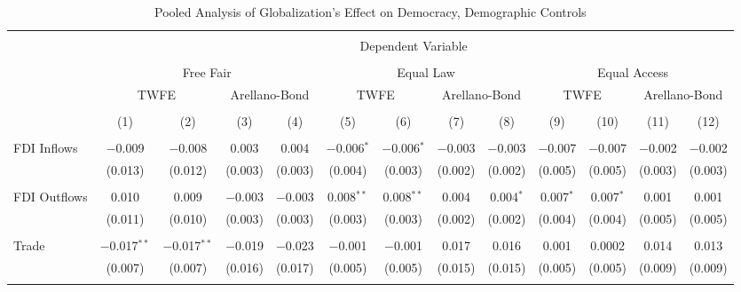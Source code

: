 
\begin{table} \centering 
  \caption{Pooled Analysis of Globalization's Effect on Democracy, Demographic Controls} 
  \label{} 
\small 
\begin{tabular}{@{\extracolsep{2pt}}lcccccccccccc} 
\\[-1.8ex]\hline 
\hline \\[-1.8ex] 
 & \multicolumn{12}{c}{Dependent Variable} \\ 
\cline{2-13} 
\\[-1.8ex] & \multicolumn{4}{c}{Free Fair} & \multicolumn{4}{c}{Equal Law} & \multicolumn{4}{c}{Equal Access} \\ 
 & \multicolumn{2}{c}{TWFE} & \multicolumn{2}{c}{Arellano-Bond} & \multicolumn{2}{c}{TWFE} & \multicolumn{2}{c}{Arellano-Bond} & \multicolumn{2}{c}{TWFE} & \multicolumn{2}{c}{Arellano-Bond} \\ 
\\[-1.8ex] & (1) & (2) & (3) & (4) & (5) & (6) & (7) & (8) & (9) & (10) & (11) & (12)\\ 
\hline \\[-1.8ex] 
 FDI Inflows & $-$0.009 & $-$0.008 & 0.003 & 0.004 & $-$0.006$^{*}$ & $-$0.006$^{*}$ & $-$0.003 & $-$0.003 & $-$0.007 & $-$0.007 & $-$0.002 & $-$0.002 \\ 
  & (0.013) & (0.012) & (0.003) & (0.003) & (0.004) & (0.003) & (0.002) & (0.002) & (0.005) & (0.005) & (0.003) & (0.003) \\ 
  & & & & & & & & & & & & \\ 
 FDI Outflows & 0.010 & 0.009 & $-$0.003 & $-$0.003 & 0.008$^{**}$ & 0.008$^{**}$ & 0.004 & 0.004$^{*}$ & 0.007$^{*}$ & 0.007$^{*}$ & 0.001 & 0.001 \\ 
  & (0.011) & (0.010) & (0.003) & (0.003) & (0.003) & (0.003) & (0.002) & (0.002) & (0.004) & (0.004) & (0.005) & (0.005) \\ 
  & & & & & & & & & & & & \\ 
 Trade & $-$0.017$^{**}$ & $-$0.017$^{**}$ & $-$0.019 & $-$0.023 & $-$0.001 & $-$0.001 & 0.017 & 0.016 & 0.001 & 0.0002 & 0.014 & 0.013 \\ 
  & (0.007) & (0.007) & (0.016) & (0.017) & (0.005) & (0.005) & (0.015) & (0.015) & (0.005) & (0.005) & (0.009) & (0.009) \\ 
  & & & & & & & & & & & & \\ 

\end{tabular}
\end{table}
